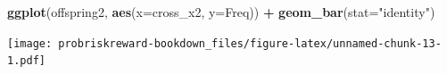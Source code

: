 \documentclass[]{book}
\newenvironment{Shaded}{\begin{snugshade}}{\end{snugshade}}
\newcommand{\KeywordTok}[1]{\textcolor[rgb]{0.13,0.29,0.53}{\textbf{#1}}}
\newcommand{\DataTypeTok}[1]{\textcolor[rgb]{0.13,0.29,0.53}{#1}}
\newcommand{\StringTok}[1]{\textcolor[rgb]{0.31,0.60,0.02}{#1}}
\newcommand{\OperatorTok}[1]{\textcolor[rgb]{0.81,0.36,0.00}{\textbf{#1}}}
\newcommand{\NormalTok}[1]{#1}
\theoremstyle{definition}
\theoremstyle{definition}
\theoremstyle{definition}
\theoremstyle{remark}
\begin{document}
\begin{Shaded}
\begin{Highlighting}[]
\KeywordTok{ggplot}\NormalTok{(offspring2, }\KeywordTok{aes}\NormalTok{(}\DataTypeTok{x=}\NormalTok{cross_x2, }\DataTypeTok{y=}\NormalTok{Freq)) }\OperatorTok{+}\StringTok{ }\KeywordTok{geom_bar}\NormalTok{(}\DataTypeTok{stat=}\StringTok{"identity"}\NormalTok{)}
\end{Highlighting}
\end{Shaded}

\texttt{[image: probriskreward-bookdown\_files/figure-latex/unnamed-chunk-13-1.pdf]}


\end{document}
